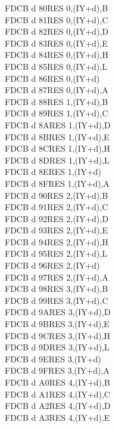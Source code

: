 \begin{multicols}{3}
{\begin{tabbing}
	FDCB d 80\>RES 0,(IY+d),B\UNDOC\\
	FDCB d 81\>RES 0,(IY+d),C\UNDOC\\
	FDCB d 82\>RES 0,(IY+d),D\UNDOC\\
	FDCB d 83\>RES 0,(IY+d),E\UNDOC\\
	FDCB d 84\>RES 0,(IY+d),H\UNDOC\\
	FDCB d 85\>RES 0,(IY+d),L\UNDOC\\
	FDCB d 86\>RES 0,(IY+d)\\
	FDCB d 87\>RES 0,(IY+d),A\UNDOC\\
	FDCB d 88\>RES 1,(IY+d),B\UNDOC\\
	FDCB d 89\>RES 1,(IY+d),C\UNDOC\\
	FDCB d 8A\>RES 1,(IY+d),D\UNDOC\\
	FDCB d 8B\>RES 1,(IY+d),E\UNDOC\\
	FDCB d 8C\>RES 1,(IY+d),H\UNDOC\\
	FDCB d 8D\>RES 1,(IY+d),L\UNDOC\\
	FDCB d 8E\>RES 1,(IY+d)\\
	FDCB d 8F\>RES 1,(IY+d),A\UNDOC\\
	FDCB d 90\>RES 2,(IY+d),B\UNDOC\\
	FDCB d 91\>RES 2,(IY+d),C\UNDOC\\
	FDCB d 92\>RES 2,(IY+d),D\UNDOC\\
	FDCB d 93\>RES 2,(IY+d),E\UNDOC\\
	FDCB d 94\>RES 2,(IY+d),H\UNDOC\\
	FDCB d 95\>RES 2,(IY+d),L\UNDOC\\
	FDCB d 96\>RES 2,(IY+d)\\
	FDCB d 97\>RES 2,(IY+d),A\UNDOC\\
	FDCB d 98\>RES 3,(IY+d),B\UNDOC\\
	FDCB d 99\>RES 3,(IY+d),C\UNDOC\\
	FDCB d 9A\>RES 3,(IY+d),D\UNDOC\\
	FDCB d 9B\>RES 3,(IY+d),E\UNDOC\\
	FDCB d 9C\>RES 3,(IY+d),H\UNDOC\\
	FDCB d 9D\>RES 3,(IY+d),L\UNDOC\\
	FDCB d 9E\>RES 3,(IY+d)\\
	FDCB d 9F\>RES 3,(IY+d),A\UNDOC\\
	FDCB d A0\>RES 4,(IY+d),B\UNDOC\\
	FDCB d A1\>RES 4,(IY+d),C\UNDOC\\
	FDCB d A2\>RES 4,(IY+d),D\UNDOC\\
	FDCB d A3\>RES 4,(IY+d),E\UNDOC\\

\end{tabbing}}
\end{multicols}
